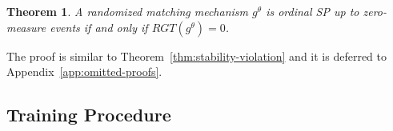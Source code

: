 \documentclass[11pt,letterpaper]{article}
\newtheorem{theorem}{Theorem}
\theoremstyle{definition}
\newcommand{\kibitz}[2]{\ifnum\Comments=1{\color{#1}{#2}}\fi}
\newcommand{\dcp}[1]{\kibitz{orange}{[DCP: #1]}}
\newcommand{\sai}[1]{\kibitz{green}{[SAI: #1]}}
\begin{document}
 

  


\begin{theorem}\label{thm:regret}
A randomized matching mechanism $g^\theta$ is ordinal SP up to zero-measure events if and only if $\mathit{RGT}(g^\theta)=0$.
\end{theorem}

The proof is similar to Theorem~\ref{thm:stability-violation} and it is deferred to Appendix~\ref{app:omitted-proofs}.
     
     
  \subsection{Training Procedure}
\end{document}
